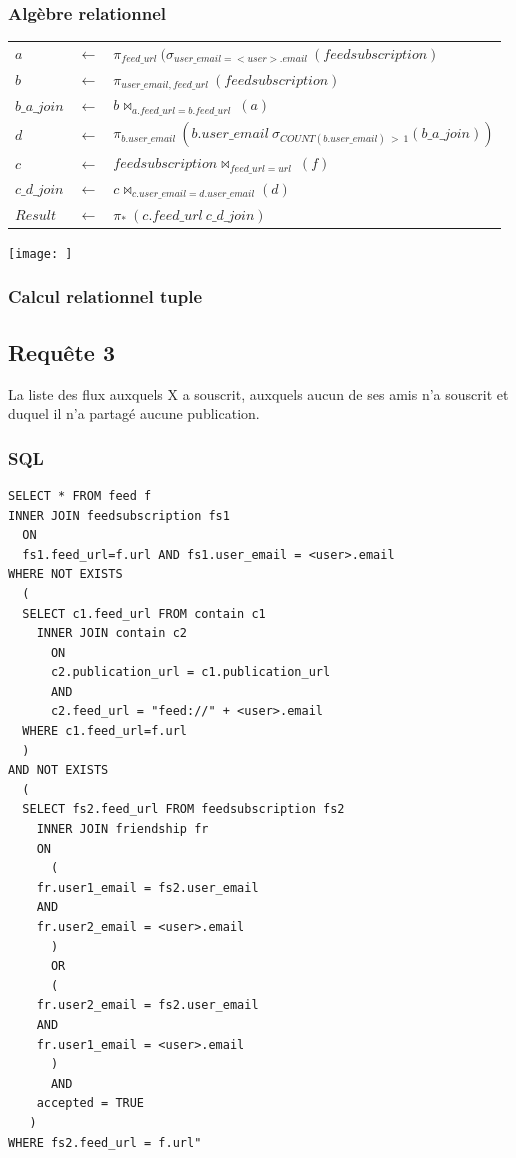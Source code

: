 \documentclass[a4paper,10pt]{article}
\begin{document}
\subsubsection{Algèbre relationnel}
\begin{center}
\begin{tabular}{lll}
$a$		& $\leftarrow$ & $ \pi_{feed\_url}\ (\sigma_{user\_email=<user>.email}\ (feedsubscription)$\\
$b$		& $\leftarrow$ & $ \pi_{user\_email, feed\_url}\ (feedsubscription)$\\
$b\_a\_join$	& $\leftarrow$ & $ b \Join_{a.feed\_url=b.feed\_url}\ (a)$\\
$d$		& $\leftarrow$ & $ \pi_{b.user\_email}\ (b.user\_email\ \sigma_{COUNT(b.user\_email)\ >\ 1} (b\_a\_join))$\\
$c$		& $\leftarrow$ & $ feedsubscription \Join_{feed\_url=url}\ (f)$\\
$c\_d\_join$	& $\leftarrow$ & $ c \Join_{c.user\_email=d.user\_email} (d)$\\
$Result$	& $\leftarrow$ & $ \pi_*\ (c.feed\_url\ c\_d\_join)$
\end{tabular}
\end{center}
\texttt{[image: ]}

\subsubsection{Calcul relationnel tuple}
\clearpage
\subsection{Requête 3}
La liste des flux auxquels X a souscrit, auxquels aucun de ses amis n’a souscrit et duquel il n’a partagé
aucune publication.
\subsubsection{SQL}

\begin{lstlisting}
SELECT * FROM feed f
INNER JOIN feedsubscription fs1 
  ON 
  fs1.feed_url=f.url AND fs1.user_email = <user>.email
WHERE NOT EXISTS 
  (
  SELECT c1.feed_url FROM contain c1
    INNER JOIN contain c2 
      ON 
      c2.publication_url = c1.publication_url
      AND 
      c2.feed_url = "feed://" + <user>.email
  WHERE c1.feed_url=f.url 
  )
AND NOT EXISTS 
  (
  SELECT fs2.feed_url FROM feedsubscription fs2
    INNER JOIN friendship fr 
    ON 
      (
	fr.user1_email = fs2.user_email
	AND
	fr.user2_email = <user>.email
      )
      OR 
      (
	fr.user2_email = fs2.user_email
	AND
	fr.user1_email = <user>.email
      )
      AND 
	accepted = TRUE
   )
WHERE fs2.feed_url = f.url"

\end{lstlisting}
\end{document}
